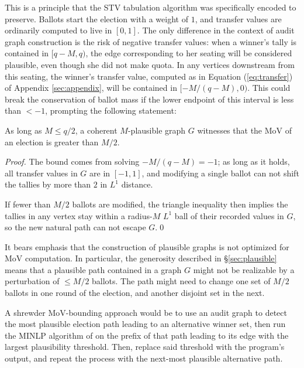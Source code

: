 This is a principle that the STV tabulation algorithm was specifically encoded to preserve.
Ballots start the election with a weight of $1$, and transfer values are ordinarily computed to live in $[0,1]$.
The only difference in the context of audit graph construction is the risk of negative transfer values: when a winner's tally is contained in $[q-M, q)$, the edge corresponding to her seating will be considered plausible, even though she did not make quota.
In any vertices downstream from this seating, the winner's transfer value, computed as in Equation (\ref{eq:transfer}) of Appendix \ref{sec:appendix}, will be contained in $[-M/(q-M), 0)$.
This could break the conservation of ballot mass if the lower endpoint of this interval is less than $< -1$, prompting the following statement:
\begin{theorem}\label{thm:reasonable}
As long as $M \leq q/2$, a coherent $M$-plausible graph $G$ witnesses that the MoV of an election is greater than $M/2$.
\end{theorem}
\begin{proof}
	The bound comes from solving $-M/(q-M)=-1$; as long as it holds, all transfer values in $G$ are in $[-1,1]$, and modifying a single ballot can not shift the tallies by more than $2$ in $L^1$ distance. 

	If fewer than $M/2$ ballots are modified, the triangle inequality then implies the tallies in any vertex stay within a radius-$M$ $L^1$ ball of their recorded values in $G$, so the new natural path can not escape $G$.\qed
\end{proof}

It bears emphasis that the construction of plausible graphs is not optimized for MoV computation. %
In particular, the generosity described in \S\ref{sec:plausible} means that a plausible path contained in a graph $G$ might not be realizable by a perturbation of $\leq M/2$ ballots.
The path might need to change one set of $M/2$ ballots in one round of the election, and another disjoint set in the next.

A shrewder MoV-bounding approach would be to use an audit graph to detect the most plausible election path leading to an alternative winner set, then run the MINLP algorithm of \cite{blomAdvancesSTVMargin2026} on the prefix of that path leading to its edge with the largest plausibility threshold. 
Then, replace said threshold with the program's output, and repeat the process with the next-most plausible alternative path.

